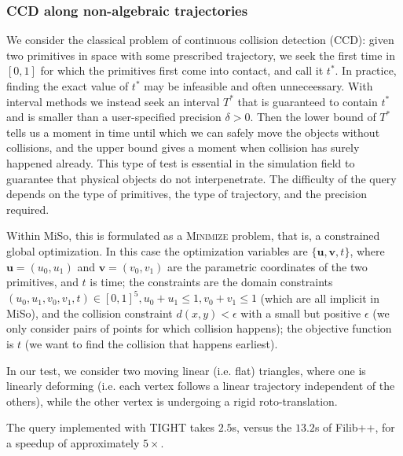 \subsubsection{CCD along non-algebraic trajectories}
We consider the classical problem of continuous collision detection (CCD): given two primitives in space with some prescribed trajectory, we seek the first time in $[0,1]$ for which the primitives first come into contact, and call it $t^*$.
In practice, finding the exact value of $t^*$ may be infeasible and often unneceessary. With interval methods we instead seek an interval $T^*$ that is guaranteed to contain $t^*$ and is smaller than a user-specified precision $\delta>0$.
Then the lower bound of $T^*$ tells us a moment in time until which we can safely move the objects without collisions, and the upper bound gives a moment when collision has surely happened already.
This type of test is essential in the simulation field to guarantee that physical objects do not interpenetrate.
The difficulty of the query depends on the type of primitives, the type of trajectory, and the precision required.

Within MiSo, this is formulated as a \textsc{Minimize} problem, that is, a constrained global optimization.
In this case the optimization variables are $\{\mathbf{u}, \mathbf{v}, t\}$, where $\mathbf{u}=(u_0, u_1)$ and $\mathbf{v}=(v_0, v_1)$ are the parametric coordinates of the two primitives, and $t$ is time;
the constraints are the domain constraints $(u_0,u_1,v_0,v_1,t)\in[0,1]^5, u_0+u_1\leq1, v_0+v_1\leq1$ (which are all implicit in MiSo), and the collision constraint $d(x,y)<\epsilon$ with a small but positive $\epsilon$ (we only consider pairs of points for which collision happens);
the objective function is $t$ (we want to find the collision that happens earliest).

In our test, we consider two moving linear (i.e. flat) triangles, where one is linearly deforming (i.e. each vertex follows a linear trajectory independent of the others), while the other vertex is undergoing a rigid roto-translation.

The query implemented with TIGHT takes $2.5$s, versus the $13.2$s of Filib++, for a speedup of approximately $5\times$.

